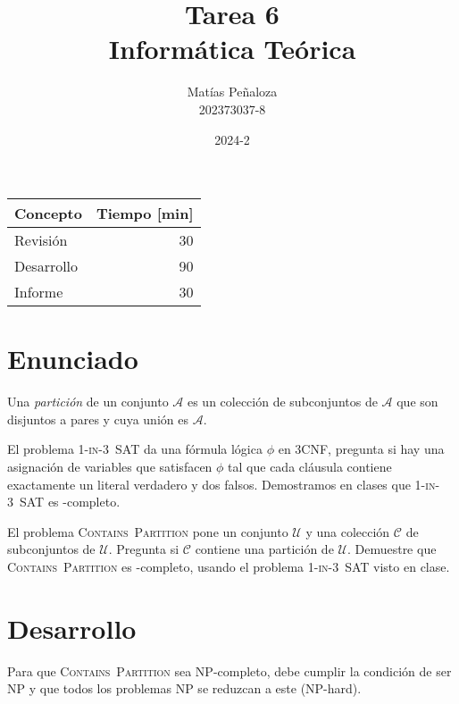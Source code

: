 \documentclass[spanish]{article}
\begin{document}
\title{
    Tarea 6 \\
    Informática Teórica
}
\author{
    Matías Peñaloza \\
    202373037-8
}
\date{
    2024-2
}
\maketitle

\begin{center}
    \begin{tabular}{|l|r|}
      \hline
      \multicolumn{1}{|c|}{\textbf{Concepto}} &
        \multicolumn{1}{c|}{\textbf{Tiempo [min]}} \\
      \hline
      Revisión & 30\\
      \hline
      Desarrollo    & 90\\
      \hline
      Informe	      & 30\\
      \hline
    \end{tabular}
  \end{center}

\section{Enunciado}
Una \emph{partición} de un conjunto \(\mathcal{A}\)
es un colección de subconjuntos de \(\mathcal{A}\)
que son disjuntos a pares
y cuya unión es \(\mathcal{A}\).

El problema \textsc{1-in-3~SAT}
da una fórmula lógica \(\phi\) en 3CNF,
pregunta si hay una asignación de variables que satisfacen \(\phi\)
tal que cada cláusula
contiene exactamente un literal verdadero y dos falsos.
Demostramos en clases que \textsc{1-in-3~SAT} es \NP\nobreakdash-completo.

El problema \textsc{Contains~Partition} pone un conjunto \(\mathcal{U}\)
y una colección \(\mathcal{C}\) de subconjuntos de \(\mathcal{U}\).
Pregunta si \(\mathcal{C}\) contiene una partición de \(\mathcal{U}\).
Demuestre que \textsc{Contains~Partition} es \NP\nobreakdash-completo,
usando el problema \textsc{1-in-3~SAT} visto en clase.

\section{Desarrollo}
    Para que \textsc{Contains~Partition} sea NP-completo, debe cumplir la condición de ser NP
    y que todos los problemas NP se reduzcan a este (NP-hard).
\end{document}
